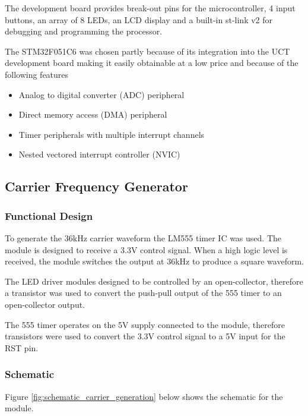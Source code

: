 The development board provides break-out pins for the microcontroller, 4 input buttons, an array of 8 LEDs, an LCD display and a built-in st-link v2 for debugging and programming the processor.

The STM32F051C6 was chosen partly because of its integration into the UCT development board making it easily obtainable at a low price and because of the following features

\begin{itemize}
	\item Analog to digital converter (ADC) peripheral
	\item Direct memory access (DMA) peripheral
	\item Timer peripherals with multiple interrupt channels
	\item Nested vectored interrupt controller (NVIC)
\end{itemize}






\subsection{Carrier Frequency Generator}
\subsubsection{Functional Design}
To generate the 36kHz carrier waveform the LM555 timer IC was used. The module is designed to receive a 3.3V control signal. When a high logic level is received, the module switches the output at 36kHz to produce a square waveform.

The LED driver modules designed to be controlled by an open-collector, therefore a transistor was used to convert the push-pull output of the 555 timer to an open-collector output.

The 555 timer operates on the 5V supply connected to the module, therefore transistors were used to convert the 3.3V control signal to a 5V input for the RST pin.

\subsubsection{Schematic}
Figure \ref{fig:schematic_carrier_generation} below shows the schematic for the module.

